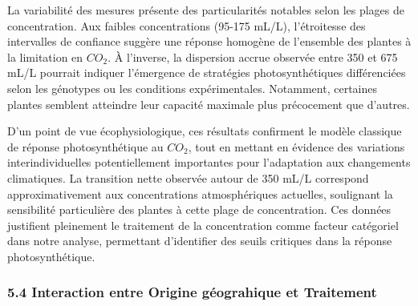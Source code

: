 \documentclass[
]{article}
\begin{document}
La variabilité des mesures présente des particularités notables selon
les plages de concentration. Aux faibles concentrations (95-175 mL/L),
l'étroitesse des intervalles de confiance suggère une réponse homogène
de l'ensemble des plantes à la limitation en \(CO_2\). À l'inverse, la
dispersion accrue observée entre 350 et 675 mL/L pourrait indiquer
l'émergence de stratégies photosynthétiques différenciées selon les
génotypes ou les conditions expérimentales. Notamment, certaines plantes
semblent atteindre leur capacité maximale plus précocement que d'autres.

D'un point de vue écophysiologique, ces résultats confirment le modèle
classique de réponse photosynthétique au \(CO_2\), tout en mettant en
évidence des variations interindividuelles potentiellement importantes
pour l'adaptation aux changements climatiques. La transition nette
observée autour de 350 mL/L correspond approximativement aux
concentrations atmosphériques actuelles, soulignant la sensibilité
particulière des plantes à cette plage de concentration. Ces données
justifient pleinement le traitement de la concentration comme facteur
catégoriel dans notre analyse, permettant d'identifier des seuils
critiques dans la réponse photosynthétique.

\subsubsection{5.4 Interaction entre Origine géograhique et
Traitement}\label{interaction-entre-origine-guxe9ograhique-et-traitement}
\end{document}
